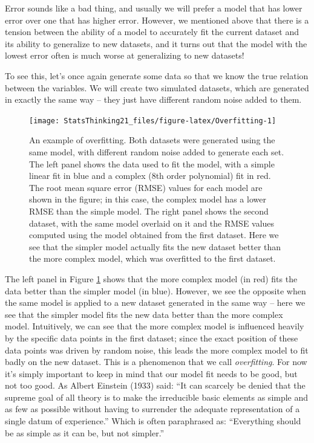 \documentclass[12pt,]{book}
\theoremstyle{definition}
\theoremstyle{definition}
\theoremstyle{definition}
\theoremstyle{remark}
\begin{document}
Error sounds like a bad thing, and usually we will prefer a model that has lower error over one that has higher error. However, we mentioned above that there is a tension between the ability of a model to accurately fit the current dataset and its ability to generalize to new datasets, and it turns out that the model with the lowest error often is much worse at generalizing to new datasets!

To see this, let's once again generate some data so that we know the true relation between the variables. We will create two simulated datasets, which are generated in exactly the same way -- they just have different random noise added to them.

\begin{figure}
\texttt{[image: StatsThinking21\_files/figure-latex/Overfitting-1]} \caption{An example of overfitting. Both datasets were generated using the same model, with different random noise added to generate each set.  The left panel shows the data used to fit the model, with a simple linear fit in blue and a complex (8th order polynomial) fit in red.  The root mean square error (RMSE) values for each model are shown in the figure; in this case, the complex model has a lower RMSE than the simple model.  The right panel shows the second dataset, with the same model overlaid on it and the RMSE values computed using the model obtained from the first dataset.  Here we see that the simpler model actually fits the new dataset better than the more complex model, which was overfitted to the first dataset.}\label{fig:Overfitting}
\end{figure}

The left panel in Figure \ref{fig:Overfitting} shows that the more complex model (in red) fits the data better than the simpler model (in blue). However, we see the opposite when the same model is applied to a new dataset generated in the same way -- here we see that the simpler model fits the new data better than the more complex model. Intuitively, we can see that the more complex model is influenced heavily by the specific data points in the first dataset; since the exact position of these data points was driven by random noise, this leads the more complex model to fit badly on the new dataset. This is a phenomenon that we call \emph{overfitting}. For now it's simply important to keep in mind that our model fit needs to be good, but not too good. As Albert Einstein (1933) said: ``It can scarcely be denied that the supreme goal of all theory is to make the irreducible basic elements as simple and as few as possible without having to surrender the adequate representation of a single datum of experience.'' Which is often paraphrased as: ``Everything should be as simple as it can be, but not simpler.''
\end{document}
